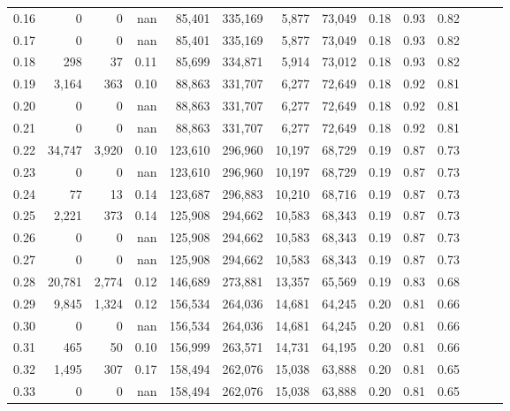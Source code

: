 \begin{tabular}{rrrrrrrrrrrrrr}
0.16 &       0 &      0 &   nan &   85,401 &  335,169 &   5,877 &  73,049 &  0.18 &  0.93 &      0.82 \\
0.17 &       0 &      0 &   nan &   85,401 &  335,169 &   5,877 &  73,049 &  0.18 &  0.93 &      0.82 \\
0.18 &     298 &     37 &  0.11 &   85,699 &  334,871 &   5,914 &  73,012 &  0.18 &  0.93 &      0.82 \\
0.19 &   3,164 &    363 &  0.10 &   88,863 &  331,707 &   6,277 &  72,649 &  0.18 &  0.92 &      0.81 \\
0.20 &       0 &      0 &   nan &   88,863 &  331,707 &   6,277 &  72,649 &  0.18 &  0.92 &      0.81 \\
0.21 &       0 &      0 &   nan &   88,863 &  331,707 &   6,277 &  72,649 &  0.18 &  0.92 &      0.81 \\
0.22 &  34,747 &  3,920 &  0.10 &  123,610 &  296,960 &  10,197 &  68,729 &  0.19 &  0.87 &      0.73 \\
0.23 &       0 &      0 &   nan &  123,610 &  296,960 &  10,197 &  68,729 &  0.19 &  0.87 &      0.73 \\
0.24 &      77 &     13 &  0.14 &  123,687 &  296,883 &  10,210 &  68,716 &  0.19 &  0.87 &      0.73 \\
0.25 &   2,221 &    373 &  0.14 &  125,908 &  294,662 &  10,583 &  68,343 &  0.19 &  0.87 &      0.73 \\
0.26 &       0 &      0 &   nan &  125,908 &  294,662 &  10,583 &  68,343 &  0.19 &  0.87 &      0.73 \\
0.27 &       0 &      0 &   nan &  125,908 &  294,662 &  10,583 &  68,343 &  0.19 &  0.87 &      0.73 \\
0.28 &  20,781 &  2,774 &  0.12 &  146,689 &  273,881 &  13,357 &  65,569 &  0.19 &  0.83 &      0.68 \\
0.29 &   9,845 &  1,324 &  0.12 &  156,534 &  264,036 &  14,681 &  64,245 &  0.20 &  0.81 &      0.66 \\
0.30 &       0 &      0 &   nan &  156,534 &  264,036 &  14,681 &  64,245 &  0.20 &  0.81 &      0.66 \\
0.31 &     465 &     50 &  0.10 &  156,999 &  263,571 &  14,731 &  64,195 &  0.20 &  0.81 &      0.66 \\
0.32 &   1,495 &    307 &  0.17 &  158,494 &  262,076 &  15,038 &  63,888 &  0.20 &  0.81 &      0.65 \\
0.33 &       0 &      0 &   nan &  158,494 &  262,076 &  15,038 &  63,888 &  0.20 &  0.81 &      0.65 \\

\end{tabular}

